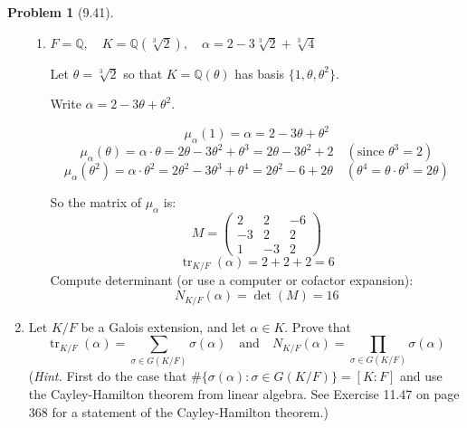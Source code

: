\documentclass[12pt]{article}
\theoremstyle{definition}
\newtheorem{problem}{Problem}
\DeclareMathOperator{\tr}{tr}
\begin{document}
\begin{problem}[9.41]
\begin{enumerate}[label=(\alph*)]
\begin{enumerate}[label=(\arabic*)]
                \item $F = \mathbb{Q}, \quad K = \mathbb{Q}(\sqrt[3]{2}), \quad \alpha = 2 - 3\sqrt[3]{2} + \sqrt[3]{4}$
                
                \begin{solution}
                    Let $\theta = \sqrt[3]{2}$ so that $K = \mathbb{Q}(\theta)$ has basis $\{1, \theta, \theta^2\}$.

                    Write $\alpha = 2 - 3\theta + \theta^2$.

                    \[
                        \mu_\alpha(1) = \alpha = 2 - 3\theta + \theta^2
                    \]
                    \[
                        \mu_\alpha(\theta) = \alpha \cdot \theta = 2\theta - 3\theta^2 + \theta^3 = 2\theta - 3\theta^2 + 2 \quad (\text{since } \theta^3 = 2)
                    \]
                    \[
                        \mu_\alpha(\theta^2) = \alpha \cdot \theta^2 = 2\theta^2 - 3\theta^3 + \theta^4 = 2\theta^2 - 6 + 2\theta \quad (\theta^4 = \theta \cdot \theta^3 = 2\theta)
                    \]

                    So the matrix of $\mu_\alpha$ is:
                    \[
                        M = \begin{pmatrix}
                            2 & 2 & -6 \\
                            -3 & 2 & 2 \\
                            1 & -3 & 2
                        \end{pmatrix}
                    \]
                    \[
                        \tr_{K/F}(\alpha) = 2 + 2 + 2 = 6
                    \]
                    Compute determinant (or use a computer or cofactor expansion):
                    \[
                        N_{K/F}(\alpha) = \det(M) = 16
                    \]
                \end{solution}
              \end{enumerate}

        \item Let $K/F$ be a Galois extension, and let $\alpha \in K$. Prove that
        \[
            \tr_{K/F}(\alpha) = \sum_{\sigma \in G(K/F)} \sigma(\alpha) \quad \text{and} \quad N_{K/F}(\alpha) = \prod_{\sigma \in G(K/F)} \sigma(\alpha)
        \]
        (\textit{Hint.} First do the case that $\#\{ \sigma(\alpha) : \sigma \in G(K/F) \} = [K : F]$ and use the Cayley-Hamilton
        theorem from linear algebra. See Exercise 11.47 on page 368 for a statement of the Cayley-Hamilton theorem.)
        

\end{enumerate}
\end{problem}
\end{document}
